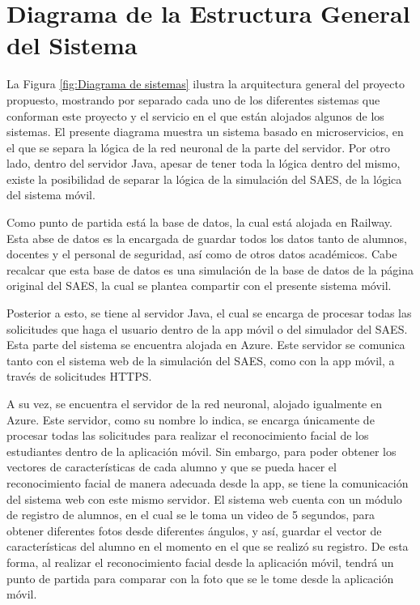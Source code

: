 \section{Diagrama de la Estructura General del Sistema} 
La Figura \ref{fig:Diagrama de sistemas} ilustra la arquitectura general del proyecto propuesto, mostrando por separado cada uno de los diferentes sistemas que conforman este proyecto y el servicio en el que están alojados algunos de los sistemas. 
El presente diagrama muestra un sistema basado en microservicios, en el que se separa la lógica de la red neuronal de la parte del servidor. Por otro lado, dentro del servidor Java, apesar de tener toda la lógica dentro del mismo, existe la posibilidad de separar la lógica de la simulación del SAES, de la lógica del sistema móvil.

Como punto de partida está la base de datos, la cual está alojada en Railway. Esta abse de datos es la encargada de guardar todos los datos tanto de alumnos, docentes y el personal de seguridad, así como de otros datos académicos. Cabe recalcar que esta base de datos es una simulación de la base de datos de la página original del SAES, la cual se plantea compartir con el presente sistema móvil.

Posterior a esto, se tiene al servidor Java, el cual se encarga de procesar todas las solicitudes que haga el usuario dentro de la app móvil o del simulador del SAES. Esta parte del sistema se encuentra alojada en Azure. Este servidor se comunica tanto con el sistema web de la simulación del SAES, como con la app móvil, a través de solicitudes HTTPS.

A su vez, se encuentra el servidor de la red neuronal, alojado igualmente en Azure. Este servidor, como su nombre lo indica, se encarga únicamente de procesar todas las solicitudes para realizar el reconocimiento facial de los estudiantes dentro de la aplicación móvil. Sin embargo, para poder obtener los vectores de características de cada alumno y que se pueda hacer el reconocimiento facial de manera adecuada desde la app, se tiene la comunicación del sistema web con este mismo servidor. El sistema web cuenta con un módulo de registro de alumnos, en el cual se le toma un video de 5 segundos, para obtener diferentes fotos desde diferentes ángulos, y así, guardar el vector de características del alumno en el momento en el que se realizó su registro. De esta forma, al realizar el reconocimiento facial desde la aplicación móvil, tendrá un punto de partida para comparar con la foto que se le tome desde la aplicación móvil.

